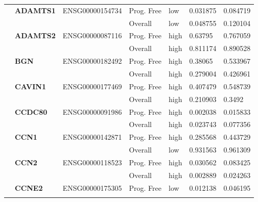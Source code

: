 \begin{spacing}{1}
{\begin{longtable}{|>{\bfseries}p{2cm}|>{\bfseries}p{1.9cm}|p{2.8cm}|p{2cm}|p{2cm}|p{1.5cm}|p{1.5cm}|}
            \multirow{2}{3cm}{False}
             & ADAMTS1  & ENSG00000154734 & Prog. Free & low  & 0.031875 & 0.084719                \\
            \hhline{~~~----}
             &          &                 & Overall    & low  & 0.048755 & 0.120104                \\
            \hhline{~======}
             & ADAMTS2  & ENSG00000087116 & Prog. Free & high & 0.63795  & 0.767059                \\
            \hhline{~~~----}
             &          &                 & Overall    & high & 0.811174 & 0.890528                \\
            \hhline{~======}
             & BGN      & ENSG00000182492 & Prog. Free & high & 0.38065  & 0.533967                \\
            \hhline{~~~----}
             &          &                 & Overall    & high & 0.279004 & 0.426961                \\
            \hhline{~======}
             & CAVIN1   & ENSG00000177469 & Prog. Free & high & 0.407479 & 0.548739                \\
            \hhline{~~~----}
             &          &                 & Overall    & high & 0.210903 & 0.3492                  \\
            \hhline{~======}
             & CCDC80   & ENSG00000091986 & Prog. Free & high & 0.002038 & 0.015833                \\
            \hhline{~~~----}
             &          &                 & Overall    & high & 0.023743 & 0.077356                \\
            \hhline{~======}
             & CCN1     & ENSG00000142871 & Prog. Free & high & 0.285568 & 0.443729                \\
            \hhline{~~~----}
             &          &                 & Overall    & low  & 0.931563 & 0.961309                \\
            \hhline{~======}
             & CCN2     & ENSG00000118523 & Prog. Free & high & 0.030562 & 0.083425                \\
            \hhline{~~~----}
             &          &                 & Overall    & high & 0.002889 & 0.024263                \\
            \hhline{~======}
             & CCNE2    & ENSG00000175305 & Prog. Free & low  & 0.012138 & 0.046195                \\
            \hhline{~~~----}

\end{longtable}}
\end{spacing}
